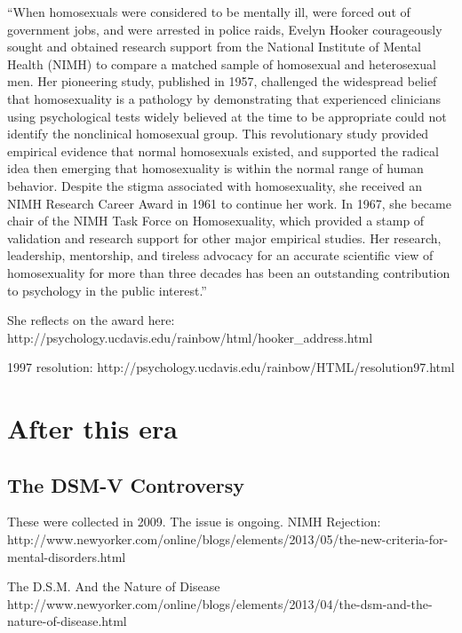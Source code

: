 ``When homosexuals were considered to be mentally ill, were forced out of government jobs, and were arrested in police raids, Evelyn Hooker courageously sought and obtained research support from the National Institute of Mental Health (NIMH) to compare a matched sample of homosexual and heterosexual men. Her pioneering study, published in 1957, challenged the widespread belief that homosexuality is a pathology by demonstrating that experienced clinicians using psychological tests widely believed at the time to be appropriate could not identify the nonclinical homosexual group. This revolutionary study provided empirical evidence that normal homosexuals existed, and supported the radical idea then emerging that homosexuality is within the normal range of human behavior. Despite the stigma associated with homosexuality, she received an NIMH Research Career Award in 1961 to continue her work. In 1967, she became chair of the NIMH Task Force on Homosexuality, which provided a stamp of validation and research support for other major empirical studies. Her research, leadership, mentorship, and tireless advocacy for an accurate scientific view of homosexuality for more than three decades has been an outstanding contribution to psychology in the public interest.''

She reflects on the award here: http:\slash \slash psychology.ucdavis.edu\slash rainbow\slash html\slash hooker\_address.html 

1997 resolution: http:\slash \slash psychology.ucdavis.edu\slash rainbow\slash HTML\slash resolution97.html

\section{After this era}
\label{afterthisera}

\subsection{The DSM-V Controversy}
\label{thedsm-vcontroversy}

These were collected in 2009. The issue is ongoing.
NIMH Rejection: http:\slash \slash www.newyorker.com\slash online\slash blogs\slash elements\slash 2013\slash 05\slash the-new-criteria-for-mental-disorders.html 

The D.S.M. And the Nature of Disease
http:\slash \slash www.newyorker.com\slash online\slash blogs\slash elements\slash 2013\slash 04\slash the-dsm-and-the-nature-of-disease.html 

